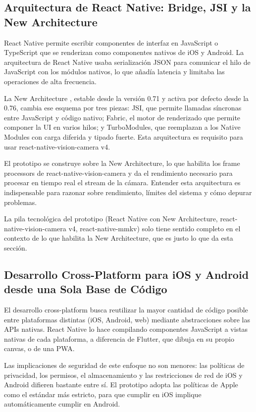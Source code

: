 \subsection{Arquitectura de React Native: Bridge, JSI y la New Architecture}

React Native permite escribir componentes de interfaz en JavaScript o TypeScript que se renderizan como componentes nativos de iOS y Android. La arquitectura de React Native usaba serializaci\'on JSON para comunicar el hilo de JavaScript con los m\'odulos nativos, lo que a\~nad\'ia latencia y limitaba las operaciones de alta frecuencia.

La New Architecture \cite{meta_rn_newarch}, estable desde la versi\'on 0.71 y activa por defecto desde la 0.76, cambia ese esquema por tres piezas: JSI, que permite llamadas s\'incronas entre JavaScript y c\'odigo nativo; Fabric, el motor de renderizado que permite componer la UI en varios hilos; y TurboModules, que reemplazan a los Native Modules con carga diferida y tipado fuerte. Esta arquitectura es requisito para usar react-native-vision-camera v4.

El prototipo se construye sobre la New Architecture, lo que habilita los frame processors de react-native-vision-camera y da el rendimiento necesario para procesar en tiempo real el stream de la c\'amara. Entender esta arquitectura es indispensable para razonar sobre rendimiento, l\'imites del sistema y c\'omo depurar problemas.

La pila tecnol\'ogica del prototipo (React Native con New Architecture, react-native-vision-camera v4, react-native-mmkv) solo tiene sentido completo en el contexto de lo que habilita la New Architecture, que es justo lo que da esta secci\'on.

\subsection{Desarrollo Cross-Platform para iOS y Android desde una Sola Base de C\'odigo}

El desarrollo cross-platform busca reutilizar la mayor cantidad de c\'odigo posible entre plataformas distintas (iOS, Android, web) mediante abstracciones sobre las APIs nativas. React Native lo hace compilando componentes JavaScript a vistas nativas de cada plataforma, a diferencia de Flutter, que dibuja en su propio canvas, o de una PWA.

Las implicaciones de seguridad de este enfoque no son menores: las pol\'iticas de privacidad, los permisos, el almacenamiento y las restricciones de red de iOS y Android difieren bastante entre s\'i. El prototipo adopta las pol\'iticas de Apple como el est\'andar m\'as estricto, para que cumplir en iOS implique autom\'aticamente cumplir en Android.

